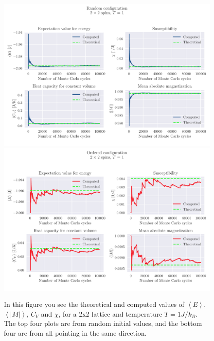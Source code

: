 \documentclass[reprint, english,notitlepage,nofootinbib]{revtex4-1}  %
\begin{document}
\begin{figure}[!htb]
	\includegraphics[width=16cm]{../output/c/L2-T1-dT0_0-NT1-N5-RandomTrue-CompCycle.pdf}
	\includegraphics[width=16cm]{../output/c/L2-T1-dT0_0-NT1-N5-RandomFalse-CompCycle.pdf}
	\caption{In this figure you see the theoretical and computed values of $\left<E\right>$, $\left<|M|\right>$, $C_V$ and $\chi$, for a 2x2 lattice and temperature $T=1J/k_B$. The top four plots are from random initial values, and the bottom four are from all pointing in the same direction.}
	\label{fig:L2_T1_Random_and_not}
\end{figure}
\end{document}
